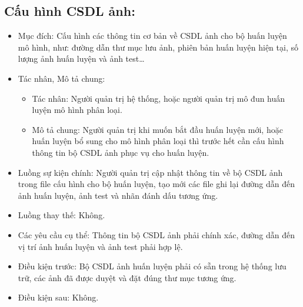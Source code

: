 \subsection{Cấu hình CSDL ảnh:}
\begin{itemize}
	\item Mục đích: Cấu hình các thông tin cơ bản về CSDL ảnh cho bộ huấn luyện mô hình, như: đường dẫn thư mục lưu ảnh, phiên bản huấn luyện hiện tại, số lượng ảnh huấn luyện và ảnh test…
	\item Tác nhân, Mô tả chung:
	\begin{itemize}
		\item Tác nhân: Người quản trị hệ thống, hoặc người quản trị mô đun huấn luyện mô hình phân loại.
		\item Mô tả chung: Người quản trị khi muốn bắt đầu huấn luyện mới, hoặc huấn luyện bổ sung cho mô hình phân loại thì trước hết cần cấu hình thông tin bộ CSDL ảnh phục vụ cho huấn luyện.
	\end{itemize}
	\item Luồng sự kiện chính: Người quản trị cập nhật thông tin về bộ CSDL ảnh trong file cấu hình cho bộ huấn luyện, tạo mới các file ghi lại đường dẫn đến ảnh huấn luyện, ảnh test và nhãn đánh dấu tương ứng.
	\item Luồng thay thế: Không.
	\item Các yêu cầu cụ thể: Thông tin bộ CSDL ảnh phải chính xác, đường dẫn đến vị trí ảnh huấn luyện và ảnh test phải hợp lệ.
	\item Điều kiện trước: Bộ CSDL ảnh huấn luyện phải có sẵn trong hệ thống lưu trữ, các ảnh đã được duyệt và đặt đúng thư mục tương ứng.
	\item Điều kiện sau: Không.
\end{itemize}

